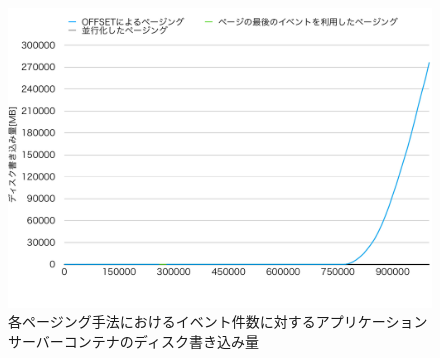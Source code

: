 \documentclass[../../../../../main]{subfiles}
\begin{document}
    \begin{figure}[H]
        \centering
        \includegraphics[width=12cm]{graph}
        \caption{各ページング手法におけるイベント件数に対するアプリケーションサーバーコンテナのディスク書き込み量}
        \label{fig:each-paging-app-disk-in-app_1_1024-db_1_1024}
    \end{figure}
\end{document}
